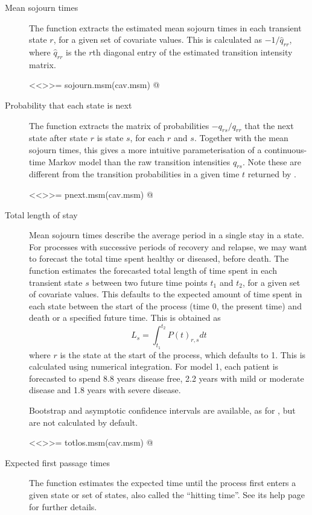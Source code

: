 \begin{description}
\item[Mean sojourn times] The function 
  extracts the estimated mean sojourn times in each transient state
  $r$, for a given set of covariate values. This is calculated as $-1
  / \hat q_{rr}$, where $\hat q_{rr}$ is the $r$th diagonal entry of
  the estimated transition intensity matrix.

<<>>=
sojourn.msm(cav.msm)
@

\item[Probability that each state is next] The function
   extracts the matrix of probabilities $-q_{rs}
  / q_{rr}$ that the next state after state $r$ is state $s$, for each
  $r$ and $s$.  Together with the mean sojourn times, this gives a more
  intuitive parameterisation of a continuous-time Markov model than
  the raw transition intensities $q_{rs}$.  Note these are different from
  the transition probabilities in a given time $t$ returned by
  .

<<>>=
pnext.msm(cav.msm)
@

\item[Total length of stay] Mean sojourn times describe the
  average period in a single stay in a state. For processes with
  successive periods of recovery and relapse, we may want to
  forecast the total time spent healthy or diseased, before
        death.  The function  estimates the
        forecasted total length of time spent in each transient state
        $s$ between two future time points $t_1$ and $t_2$, for a
        given set of covariate values. This defaults to the expected
        amount of time spent in each state between the start of the
        process (time 0, the present time) and death or a specified
        future time. This is obtained as
\[
L_s = \int_{t_1}^{t_2} P(t)_{r,s} dt
\]
where $r$ is the state at the start of the process, which defaults to
1. This is calculated using numerical integration.  For model 1, each
patient is forecasted to spend 8.8 years disease free, 2.2 years with
mild or moderate disease and 1.8 years with severe disease.

Bootstrap and asymptotic confidence intervals are available, as for
, but are not calculated by default.

<<>>=
totlos.msm(cav.msm)
@

\item[Expected first passage times] The function  estimates
  the expected time until the process first enters a given state or set of states,
  also called the ``hitting time''.  See its help page for further details.


\end{description}

